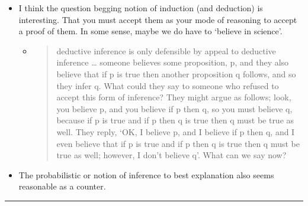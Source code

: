 \documentclass[11pt]{article}
\begin{document}
\begin{itemize}
\tightlist
\item
  I think the question begging notion of induction (and deduction) is
  interesting. That you must accept them as your mode of reasoning to
  accept a proof of them. In some sense, maybe we do have to `believe in
  science'.

  \begin{itemize}
  \item
    \begin{quote}
    deductive inference is only defensible by appeal to deductive
    inference \ldots{} someone believes some proposition, p, and they
    also believe that if p is true then another proposition q follows,
    and so they infer q. What could they say to someone who refused to
    accept this form of inference? They might argue as follows; look,
    you believe p, and you believe if p then q, so you must believe q,
    because if p is true and if p then q is true then q must be true as
    well. They reply, `OK, I believe p, and I believe if p then q, and I
    even believe that if p is true and if p then q is true then q must
    be true as well; however, I don't believe q'. What can we say now?
    \end{quote}
  \end{itemize}
\item
  The probabilistic or notion of inference to best explanation also
  seems reasonable as a counter.
\end{itemize}

\begin{center}\rule{0.5\linewidth}{\linethickness}\end{center}
\end{document}
